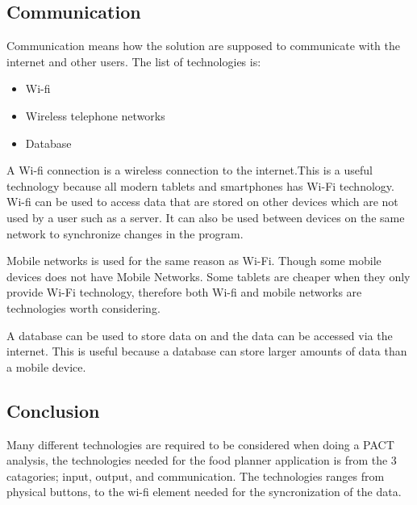 \subsection{Communication}

Communication means how the solution are supposed to communicate with the internet and other users. The list of technologies is:

\begin{itemize}
	\item Wi-fi
	\item Wireless telephone networks    
    \item Database
\end{itemize}

A Wi-fi connection is a wireless connection to the internet.This is a useful technology because all modern tablets and smartphones has Wi-Fi technology. Wi-fi can be used to access data that are stored on other devices which are not used by a user such as a server. It can also be used between devices on the same network to synchronize changes in the program.    

Mobile networks is used for the same reason as Wi-Fi. Though some mobile devices does not have Mobile Networks. Some tablets are cheaper when they only provide Wi-Fi technology, therefore both Wi-fi and mobile networks are technologies worth considering.

A database can be used to store data on and the data can be accessed via the internet. This is useful because a database can store larger amounts of data than a mobile device. 
 
\subsection{Conclusion}

Many different technologies are required to be considered when doing a PACT analysis, the technologies needed for the food planner application is from the 3 catagories; input, output, and communication. The technologies ranges from physical buttons, to the wi-fi element needed for the syncronization of the data.
